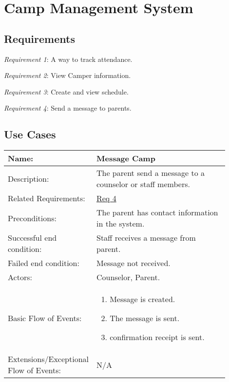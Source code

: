 \documentclass[11pt]{article}
\begin{document}
\clearpage



\appendix
\section{Camp Management System}\label{appendix:camp_sys}
\subsection{Requirements}

\noindent\textit{\hypertarget{Req1}{Requirement 1}}: A way to track attendance.\vspace{0.5em}

\noindent\textit{\hypertarget{Req2}{Requirement 2}}: View Camper information.\vspace{0.5em}

\noindent\textit{\hypertarget{Req3}{Requirement 3}}: Create and view schedule.\vspace{0.5em}

\noindent\textit{\hypertarget{Req4}{Requirement 4}}: Send a message to parents.\vspace{0.5em}

\subsection{Use Cases}

\begin{table}[!htb]
\begin{center}
\begin{tabular}{p{0.30\linewidth}p{0.60\linewidth}}
	Name: & Message Camp\\\hline
	Description: & The parent send a message to a counselor or staff members.\\\hline
	Related Requirements:& \hyperlink{Req4}{Req 4}\\\hline
	Preconditions:& The parent has contact information in the system.\\\hline
	Successful end condition:& Staff receives a message from parent.\\\hline
	Failed end condition:& Message not received. \\\hline
	Actors:& Counselor, Parent.\\\hline
	Basic Flow of Events: & \begin{enumerate}[topsep=0pt]
		\item Message is created.
		\item The message is sent.
		\item confirmation receipt is sent.
	\end{enumerate}\\\hline
	Extensions/Exceptional Flow of Events: & \vspace*{.25em}  N/A
\end{tabular}
\label{des:message camp}	
\end{center}
\end{table}
\end{document}
